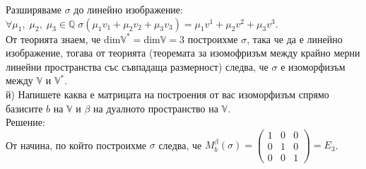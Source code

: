 \documentclass[12pt]{article}
\newcommand{\Q}{\mathbb{Q}}
\newcommand{\V}{\mathbb{V}}
\begin{document}
Разширяваме $\sigma$ до линейно изображение: \\
$\forall \mu_1, \; \mu_2, \; \mu_3 \in \Q \; \sigma(\mu_1v_1 + \mu_2v_2 + \mu_3v_3) = \mu_1v^1 + \mu_2v^2 + \mu_3v^3$. \\

От теорията знаем, че $\mathrm{dim}\V^* = \mathrm{dim}\V = 3$ построихме $\sigma$, така че да е линейно изображение,
тогава от теорията (теоремата за изомофризъм между крайно мерни линейни пространства със съвпадаща размерност) следва, че $\sigma$ е изоморфизъм между $\V$ и $\V^*$. \\

й) Напишете каква е матрицата на построения от вас изоморфизъм спрямо базисите $b$ на $\V$ и $\beta$ на дуалното пространство на $\V$. \\

Решение: \\

От начина, по който построихме $\sigma$ следва, че $M_b^\beta(\sigma) = \begin{pmatrix}
    1 & 0 & 0 \\
    0 & 1 & 0 \\
    0 & 0 & 1
\end{pmatrix} = E_3$.
\end{document}
